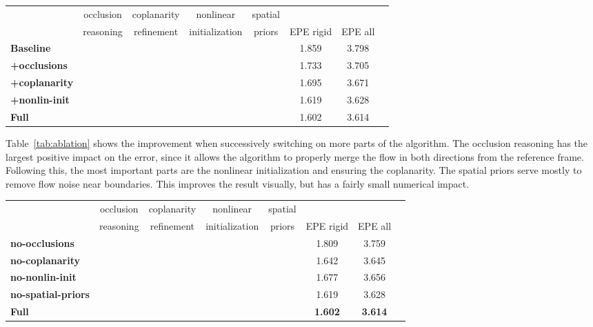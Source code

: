 \documentclass[10pt,twocolumn,letterpaper]{article}
\begin{document}
\noindent
\begin{table*}[h!]
\centering
\begin{tabular}{lccccccc}
\toprule
& occlusion & coplanarity  & nonlinear  & spatial & & \\
& reasoning & refinement   & initialization & priors & EPE rigid & EPE all \\
\midrule
\textbf{Baseline} &  &  &   &   & 1.859 & 3.798 \\
\textbf{+occlusions} &  &  &   &   & 1.733 & 3.705 \\
\textbf{+coplanarity} &  &  &   &   & 1.695 & 3.671 \\
\textbf{+nonlin-init} &  &  &   &   & 1.619 & 3.628 \\
\textbf{Full} &  &  &   &   & 1.602 & 3.614 \\
\bottomrule
\end{tabular}
\caption{Errors when successively switching on parts of the algorithm}
\label{tab:ablation}
\end{table*}

Table~\ref{tab:ablation} shows the improvement when successively switching on more parts of the algorithm.
The occlusion reasoning has the largest positive impact on the error, since it allows the algorithm to properly merge the flow in both directions from the reference frame.
Following this, the most important parts are the nonlinear initialization and ensuring the coplanarity.
The spatial priors serve mostly to remove flow noise near boundaries. 
This improves the result visually, but has a fairly small numerical impact.

\begin{table*}[h!]
\centering
\begin{tabular}{lccccccc}
\toprule
& occlusion & coplanarity  & nonlinear  & spatial & & \\
& reasoning & refinement   & initialization & priors & EPE rigid & EPE all \\
\midrule
\textbf{no-occlusions} &  &  &  &   & 1.809 & 3.759 \\
\textbf{no-coplanarity} &  &  &  &   & 1.642 & 3.645 \\
\textbf{no-nonlin-init} &  &  &  &   & 1.677 & 3.656 \\
\textbf{no-spatial-priors} &  &  &  &   & 1.619 & 3.628 \\
\textbf{Full} &  &  &   &   & \textbf{1.602} & \textbf{3.614} \\
\bottomrule
\end{tabular}
\caption{Errors when disabling individual parts of the algorithm}
\label{tab:disabling}
\end{table*}
\end{document}
